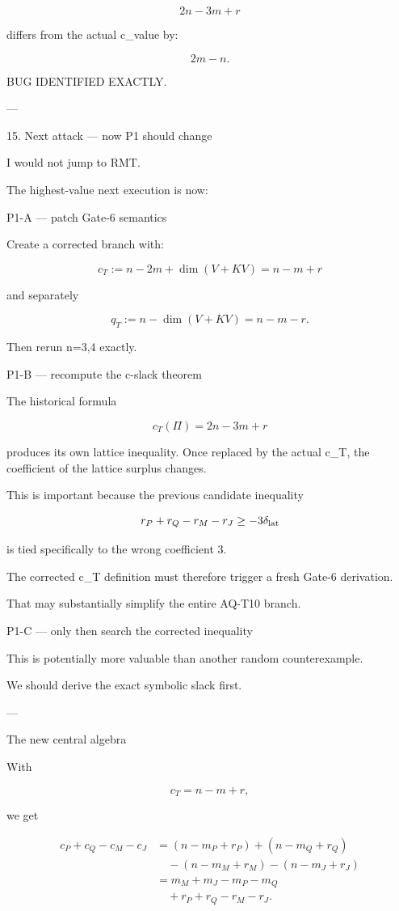 \[
2n-3m+r
\]

differs from the actual c_value by:

\[
\boxed{2m-n}.
\]

BUG IDENTIFIED EXACTLY.


---

15. Next attack — now P1 should change

I would not jump to RMT.

The highest-value next execution is now:

P1-A — patch Gate-6 semantics

Create a corrected branch with:

\[
c_T:=n-2m+\dim(V+KV)=n-m+r
\]

and separately

\[
q_T:=n-\dim(V+KV)=n-m-r.
\]

Then rerun n=3,4 exactly.

P1-B — recompute the c-slack theorem

The historical formula

\[
c_T(\Pi)=2n-3m+r
\]

produces its own lattice inequality. Once replaced by the actual c_T, the coefficient of the lattice surplus changes.

This is important because the previous candidate inequality

\[
r_P+r_Q-r_M-r_J\ge -3\delta_{\rm lat}
\]

is tied specifically to the wrong coefficient \(3\).

The corrected c_T definition must therefore trigger a fresh Gate-6 derivation.

That may substantially simplify the entire AQ-T10 branch.

P1-C — only then search the corrected inequality

This is potentially more valuable than another random counterexample.

We should derive the exact symbolic slack first.


---

The new central algebra

With

\[
c_T=n-m+r,
\]

we get

\[
\begin{aligned}
c_P+c_Q-c_M-c_J
&=
(n-m_P+r_P)+(n-m_Q+r_Q)\\
&\quad -(n-m_M+r_M)-(n-m_J+r_J)\\
&=
m_M+m_J-m_P-m_Q\\
&\quad+r_P+r_Q-r_M-r_J.
\end{aligned}
\]


